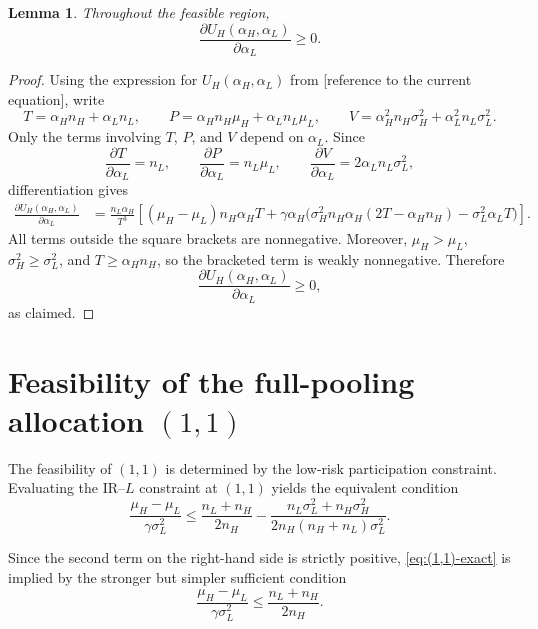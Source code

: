 \documentclass[a4paper,12pt]{article}
\newtheorem{lemma}[theorem]{Lemma}
\theoremstyle{definition}
\theoremstyle{remark}
\newcommand{\1}{\mathbf{1}}
\begin{document}
\begin{lemma}
\label{lem:UH-vertical-monotone}
Throughout the feasible region,
\[
\frac{\partial U_H(\alpha_H,\alpha_L)}{\partial \alpha_L}\ge 0.
\]
\end{lemma}

\begin{proof}
Using the expression for \(U_H(\alpha_H,\alpha_L)\) from
[reference to the current equation], write
\[
T=\alpha_H n_H+\alpha_L n_L,
\qquad
P=\alpha_H n_H\mu_H+\alpha_L n_L\mu_L,
\qquad
V=\alpha_H^2 n_H\sigma_H^2+\alpha_L^2 n_L\sigma_L^2 .
\]
Only the terms involving \(T\), \(P\), and \(V\) depend on \(\alpha_L\). Since
\[
\frac{\partial T}{\partial \alpha_L}=n_L,
\qquad
\frac{\partial P}{\partial \alpha_L}=n_L\mu_L,
\qquad
\frac{\partial V}{\partial \alpha_L}=2\alpha_L n_L\sigma_L^2,
\]
differentiation gives
\begin{align*}
\frac{\partial U_H(\alpha_H,\alpha_L)}{\partial \alpha_L}
&=
\frac{n_L\alpha_H}{T^3}
\left[
(\mu_H-\mu_L)n_H\alpha_H T
+
\gamma\alpha_H
\Big(
\sigma_H^2 n_H\alpha_H(2T-\alpha_H n_H)
-\sigma_L^2\alpha_L T
\Big)
\right].
\end{align*}
All terms outside the square brackets are nonnegative. Moreover,
\(\mu_H>\mu_L\), \(\sigma_H^2\ge \sigma_L^2\), and \(T\ge \alpha_H n_H\), so the
bracketed term is weakly nonnegative. Therefore
\[
\frac{\partial U_H(\alpha_H,\alpha_L)}{\partial \alpha_L}\ge 0,
\]
as claimed.
\end{proof}

\section{Feasibility of the full-pooling allocation \((1,1)\)}
\label{app:pooling-feasibility}

The feasibility of \((1,1)\) is determined by the low-risk participation
constraint. Evaluating the IR--\(L\) constraint at \((1,1)\) yields the
equivalent condition
\begin{equation}\label{eq:(1,1)-exact}
    \frac{\mu_H - \mu_L}{\gamma \sigma_L^2}
    \le
    \frac{n_L + n_H}{2 n_H}
    -
    \frac{n_L\sigma_L^2 + n_H\sigma_H^2}
         {2 n_H (n_H+n_L)\sigma_L^2}.
\end{equation}

Since the second term on the right-hand side is strictly positive,
\eqref{eq:(1,1)-exact} is implied by the stronger but simpler sufficient
condition
\begin{equation}\label{eq:(1,1)-simple}
    \frac{\mu_H - \mu_L}{\gamma \sigma_L^2}
    \le
    \frac{n_L + n_H}{2 n_H}.
\end{equation}
\end{document}
